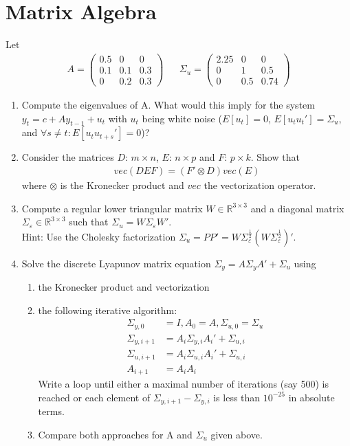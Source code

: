 \section[Matrix Algebra]{Matrix Algebra\label{ex:MatrixAlgebra}}
Let
\begin{align*}
A = \begin{pmatrix}0.5 &0 &0 \\0.1&0.1&0.3\\0&0.2&0.3 \end{pmatrix}
&&
\Sigma_u = \begin{pmatrix}2.25 & 0 & 0\\ 0 & 1 & 0.5\\ 0 & 0.5 & 0.74 \end{pmatrix}
\end{align*}

\begin{enumerate}

\item
Compute the eigenvalues of A.
What would this imply for the system \(y_t = c + A y_{t-1} + u_t\) with \(u_t\) being white noise
  (\(E[u_t]=0\), \(E[u_t u_t'] = \Sigma_u\), and \(\forall s\neq t: E[u_t u_{t+s}'] = 0\))?

\item
Consider the matrices \(D\): \(m\times n\), \(E\): \(n\times p\) and \(F\): \(p\times k\).
Show that
\begin{align*}
vec(DEF)=\left(F'\otimes D\right) vec(E)
\end{align*}
where \(\otimes \) is the Kronecker product and \(vec\) the vectorization operator.

\item
Compute a regular lower triangular matrix \(W \in \mathbb{R}^{3 \times 3}\)
  and a diagonal matrix \(\Sigma_\varepsilon \in \mathbb{R}^{3 \times 3}\)
  such that \(\Sigma_u=W \Sigma_\varepsilon W'\).
\\
Hint: Use the Cholesky factorization
\(\Sigma_u = P P' = W \Sigma_\varepsilon^{\frac{1}{2}}(W \Sigma_\varepsilon^{\frac{1}{2}})'\).

\item
Solve the discrete Lyapunov matrix equation \(\Sigma_{y} = A\Sigma_{y}A' + \Sigma_{u}\) using
\begin{enumerate}
  \item the Kronecker product and vectorization
  \item the following iterative algorithm:
  \begin{align*}
  \Sigma_{y,0} &= I, A_0 = A, \Sigma_{u,0} = \Sigma_{u}\\
  \Sigma_{y,i+1} &= A_i \Sigma_{y,i} A_i' + \Sigma_{u,i}\\
  \Sigma_{u,i+1} &= A_i \Sigma_{u,i} A_i' + \Sigma_{u,i}\\
  A_{i+1} &= A_i A_i
  \end{align*}
  Write a loop until either a maximal number of iterations (say 500) is reached
    or each element of \(\Sigma_{y,i+1}-\Sigma_{y,i}\) is less than \(10^{-25}\) in absolute terms.
  \item Compare both approaches for A and \(\Sigma_u\) given above.
\end{enumerate}


\end{enumerate}
